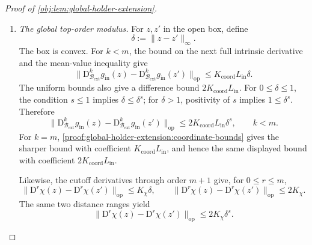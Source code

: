 \begin{proof}[Proof of \cref{obj:lem:global-holder-extension}]
\begin{enumerate}
\item\label{proof:global-holder-extension:global-modulus} \emph{The global top-order modulus.}
For \(z,z'\) in the open box, define
\[
\delta:=\|z-z'\|_\infty.
\]
The box is convex. For \(k<m\), the bound on the next full intrinsic derivative and the mean-value inequality give
\[
\|\mathrm D_{\mathcal B_{\mathrm{ext}}}^{k}g_{\mathrm{in}}(z)
-\mathrm D_{\mathcal B_{\mathrm{ext}}}^{k}g_{\mathrm{in}}(z')\|_{\mathrm{op}}
\le K_{\mathrm{coord}}L_{\mathrm{in}}\delta.
\]
The uniform bounds also give a difference bound
\(2K_{\mathrm{coord}}L_{\mathrm{in}}\). For \(0\le\delta\le1\), the condition \(s\le1\) implies \(\delta\le\delta^s\); for \(\delta>1\), positivity of \(s\) implies \(1\le\delta^s\). Therefore
\[
\|\mathrm D_{\mathcal B_{\mathrm{ext}}}^{k}g_{\mathrm{in}}(z)
-\mathrm D_{\mathcal B_{\mathrm{ext}}}^{k}g_{\mathrm{in}}(z')\|_{\mathrm{op}}
\le2K_{\mathrm{coord}}L_{\mathrm{in}}\delta^s,
\qquad k<m.
\]
For \(k=m\), \cref{proof:global-holder-extension:coordinate-bounds} gives the sharper bound with coefficient
\(K_{\mathrm{coord}}L_{\mathrm{in}}\), and hence the same displayed bound with coefficient \(2K_{\mathrm{coord}}L_{\mathrm{in}}\).

Likewise, the cutoff derivatives through order \(m+1\) give, for \(0\le r\le m\),
\[
\|\mathrm D^r\chi(z)-\mathrm D^r\chi(z')\|_{\mathrm{op}}
\le K_\chi\delta,
\qquad
\|\mathrm D^r\chi(z)-\mathrm D^r\chi(z')\|_{\mathrm{op}}
\le2K_\chi.
\]
The same two distance ranges yield
\[
\|\mathrm D^r\chi(z)-\mathrm D^r\chi(z')\|_{\mathrm{op}}
\le2K_\chi\delta^s.
\]


\end{enumerate}
\end{proof}
